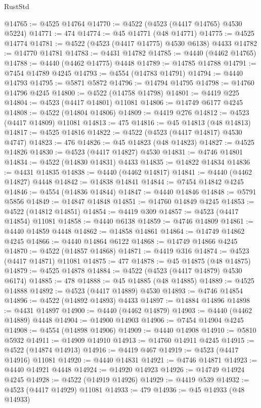 \begin{lexlean}{RustStd}
\begin{coremodule}
{\begin{coremodule}
{{{{{{{{{{{{{{{{{{{{{{{{{{{{{{{{{{{{{{{{{{{{{{{{{{{{{{{{{{{{@14765 := @4525 @14764
@14770 := @4522 (@4523 (@4417 @14765) @4530 @5224)
@14771 := 474
@14774 := @45 @14771 (@48 @14771)
@14775 := @4525 @14774
@14781 := @4522 (@4523 (@4417 @14775) @4530 @6138) @4433
@14782 := @14770 @14781
@14783 := @4431 @14782
@14785 := @4440 (@4462 @14765)
@14788 := @4440 (@4462 @14775) @4448
@14789 := @14785 @14788
@14791 := @7454 @14789 @4245
@14793 := @4554 (@14783 @14791)
@14794 := @4440 @14793
@14795 := @5871 @5872
@14796 := @14794 @14795
@14798 := @14760 @14796 @4245
@14800 := @4522 (@14758 @14798)
@14801 := @4419 @225
@14804 := @4523 (@4417 @14801) @11081
@14806 := @14749 @6177 @4245
@14808 := @4522 (@14804 @14806)
@14809 := @4419 @276
@14812 := @4523 (@4417 @14809) @11081
@14813 := 475
@14816 := @45 @14813 (@48 @14813)
@14817 := @4525 @14816
@14822 := @4522 (@4523 (@4417 @14817) @4530 @4747)
@14823 := 476
@14826 := @45 @14823 (@48 @14823)
@14827 := @4525 @14826
@14830 := @4523 (@4417 @14827) @4530
@14831 := @4746 @14801
@14834 := @4522 (@14830 @14831) @4433
@14835 := @14822 @14834
@14836 := @4431 @14835
@14838 := @4440 (@4462 @14817)
@14841 := @4440 (@4462 @14827) @4448
@14842 := @14838 @14841
@14844 := @7454 @14842 @4245
@14846 := @4554 (@14836 @14844)
@14847 := @4440 @14846
@14848 := @5791 @5856
@14849 := @14847 @14848
@14851 := @14760 @14849 @4245
@14853 := @4522 (@14812 @14851)
@14854 := @4419 @309
@14857 := @4523 (@4417 @14854) @11081
@14858 := @4440 @6138
@14859 := @4746 @14809
@14861 := @4440 @14859 @4448
@14862 := @14858 @14861
@14864 := @14749 @14862 @4245
@14866 := @4440 @14864 @6122
@14868 := @14749 @14866 @4245
@14870 := @4522 (@14857 @14868)
@14871 := @4419 @316
@14874 := @4523 (@4417 @14871) @11081
@14875 := 477
@14878 := @45 @14875 (@48 @14875)
@14879 := @4525 @14878
@14884 := @4522 (@4523 (@4417 @14879) @4530 @6174)
@14885 := 478
@14888 := @45 @14885 (@48 @14885)
@14889 := @4525 @14888
@14892 := @4523 (@4417 @14889) @4530
@14893 := @4746 @14854
@14896 := @4522 (@14892 @14893) @4433
@14897 := @14884 @14896
@14898 := @4431 @14897
@14900 := @4440 (@4462 @14879)
@14903 := @4440 (@4462 @14889) @4448
@14904 := @14900 @14903
@14906 := @7454 @14904 @4245
@14908 := @4554 (@14898 @14906)
@14909 := @4440 @14908
@14910 := @5810 @5932
@14911 := @14909 @14910
@14913 := @14760 @14911 @4245
@14915 := @4522 (@14874 @14913)
@14916 := @4419 @467
@14919 := @4523 (@4417 @14916) @11081
@14920 := @4440 @14831
@14921 := @4746 @14871
@14923 := @4440 @14921 @4448
@14924 := @14920 @14923
@14926 := @14749 @14924 @4245
@14928 := @4522 (@14919 @14926)
@14929 := @4419 @539
@14932 := @4523 (@4417 @14929) @11081
@14933 := 479
@14936 := @45 @14933 (@48 @14933)
}}}}}}}}}}}}}}}}}}}}}}}}}}}}}}}}}}}}}}}}}}}}}}}}}}}}}}}}}}}}
\end{coremodule}}
\end{coremodule}
\end{lexlean}
